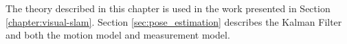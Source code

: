 \begin{comment}
\paragraph{Particle Filter}
The key idea of the \textit{Particle Filter}  is to represent the posterior $bel(x_t)$ by a set of random state particles (samples) drawn from this posterior.
This representation is approximate, but can represent a much broader space of discributions than the single-hypothesis trackers.
Another advantage is that the transformations are not limited to linear functions anymore.

The particles (samples) are denoted
\begin{equation}
\chi = x_t^{[1]}, x_t^{[2]}, \hdots, x_t^{[M]}
\end{equation}
Each particle $x_t^{[m]}$ is a state hypothesis at time $t$.
Ideally, the likelihood for a state hypothesis $x_t$ to be in $\chi$, should be proportional to $bel(x_t)$.
The denser a subregion of the the space is populated with particles, the more likely it is that the true state falls into this region.
In the prediction step, the motion model is applied to each particle $x_{t-1}^{[m]}$ to generate a prediction $x_t^{[m]}$.
When observation $z_t$ is made, the \textit{importance factor} $w_t^{[m]}$ is computed.
\begin{equation}
w_t^{[m]} = p ( z_t | x_t^{[m]}, z_{0 \to t-1})
\end{equation}
The final step of the particle filter is {resampling}, in which the current set of particles re-sampled based on the computed likelihoods.
The algorithm draws with replacement $M$ particles from the temporary set $\overline{\chi}_t$.
The probability of each particle is given by its importance weights.
This changes the distribution of the particle from $\overline{bel}(x_t)$ to $bel(x_t)$.

Particle filters overcome the limitations of using a Gaussian to represent a probability distribution.
With sufficient samples, they approach the Bayesian optimal estimate, so they can be made more accurate than either the EKF or UKF.
The increased representational power of particle filters comes at the cost of higher computational complexity.
And, when the number of particles is unsufficient, the particle filter might suffer from sample impoverishment.
\end{comment}

The theory described in this chapter is used in the work presented in Section \ref{chapter:visual-slam}.
Section \ref{sec:pose_estimation} describes the Kalman Filter and both the motion model and measurement model.